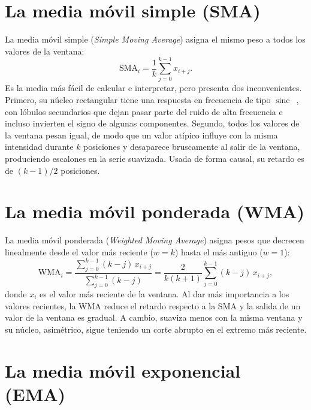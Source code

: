 \documentclass[11pt,a4paper]{article}
\begin{document}
\section{La media móvil simple (SMA)}

La media móvil simple (\emph{Simple Moving Average}) asigna el mismo peso a
todos los valores de la ventana:
\begin{equation}
    \mathrm{SMA}_i = \frac{1}{k} \sum_{j=0}^{k-1} x_{i+j}.
\end{equation}
Es la media más fácil de calcular e interpretar, pero presenta dos
inconvenientes. Primero, su núcleo rectangular tiene una respuesta en
frecuencia de tipo $\operatorname{sinc}$~\cite{smith}, con lóbulos secundarios que dejan pasar
parte del ruido de alta frecuencia e incluso invierten el signo de algunas
componentes. Segundo, todos los valores de la ventana pesan igual, de modo que
un valor atípico influye con la misma intensidad durante $k$ posiciones y
desaparece bruscamente al salir de la ventana, produciendo escalones en la
serie suavizada. Usada de forma causal, su retardo es de $(k-1)/2$ posiciones.

\section{La media móvil ponderada (WMA)}

La media móvil ponderada (\emph{Weighted Moving Average}) asigna pesos que
decrecen linealmente desde el valor más reciente ($w = k$) hasta el más antiguo
($w = 1$):
\begin{equation}
    \mathrm{WMA}_i = \frac{\sum_{j=0}^{k-1} (k - j)\, x_{i+j}}{\sum_{j=0}^{k-1} (k - j)}
                   = \frac{2}{k(k+1)} \sum_{j=0}^{k-1} (k - j)\, x_{i+j},
\end{equation}
donde $x_i$ es el valor más reciente de la ventana. Al dar más importancia a los
valores recientes, la WMA reduce el retardo respecto a la SMA y la salida de un
valor de la ventana es gradual. A cambio, suaviza menos con la misma ventana y
su núcleo, asimétrico, sigue teniendo un corte abrupto en el extremo más
reciente.

\section{La media móvil exponencial (EMA)}
\end{document}
